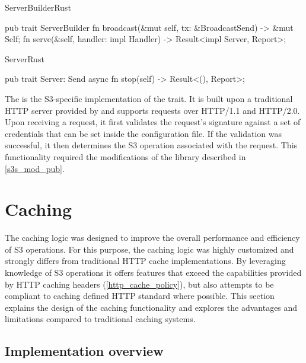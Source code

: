 \begin{multicols}{2}
	\begin{codeblock}{ServerBuilder}{Rust}
		\begin{rustcode}
			pub trait ServerBuilder {
				fn broadcast(&mut self, tx: &BroadcastSend) -> &mut Self;
				fn serve(&self, handler: impl Handler) -> Result<impl Server, Report>;
			}
		\end{rustcode}
	\end{codeblock}

	\begin{codeblock}{Server}{Rust}
		\begin{rustcode}
			pub trait Server: Send {
				async fn stop(self) -> Result<(), Report>;
			}
		\end{rustcode}
	\end{codeblock}
\end{multicols}

The  is the S3-specific implementation of the  trait. It is built upon a traditional HTTP server provided by  and supports requests over HTTP/1.1 and HTTP/2.0. Upon receiving a request, it first validates the request's signature against a set of credentials that can be set inside the configuration file. If the validation was successful, it then determines the S3 operation associated with the request. This functionality required the modifications of the  library described in \ref{s3s_mod_pub}.

\section{Caching}

The caching logic was designed to improve the overall performance and efficiency of S3 operations. For this purpose, the caching logic was highly customized and strongly differs from traditional HTTP cache implementations. By leveraging knowledge of S3 operations it offers features that exceed the capabilities provided by HTTP caching headers (\ref{http_cache_policy}), but also attempts to be compliant to caching defined HTTP standard where possible. This section explains the design of the caching functionality and explores the advantages and limitations compared to traditional caching systems.

\subsection{Implementation overview}

